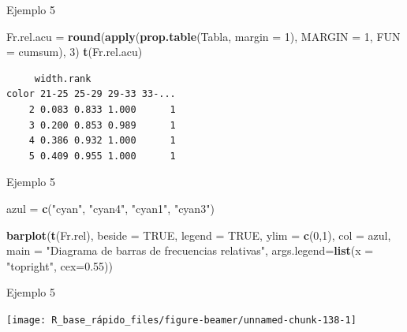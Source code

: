 \documentclass[
  ignorenonframetext,
  aspectratio=169]{beamer}
\newenvironment{Shaded}{\begin{snugshade}}{\end{snugshade}}
\newcommand{\AttributeTok}[1]{\textcolor[rgb]{0.13,0.29,0.53}{#1}}
\newcommand{\ConstantTok}[1]{\textcolor[rgb]{0.56,0.35,0.01}{#1}}
\newcommand{\DecValTok}[1]{\textcolor[rgb]{0.00,0.00,0.81}{#1}}
\newcommand{\FloatTok}[1]{\textcolor[rgb]{0.00,0.00,0.81}{#1}}
\newcommand{\FunctionTok}[1]{\textcolor[rgb]{0.13,0.29,0.53}{\textbf{#1}}}
\newcommand{\NormalTok}[1]{#1}
\newcommand{\OtherTok}[1]{\textcolor[rgb]{0.56,0.35,0.01}{#1}}
\newcommand{\StringTok}[1]{\textcolor[rgb]{0.31,0.60,0.02}{#1}}
\begin{document}
\begin{frame}[fragile]{Ejemplo 5}
\label{ejemplo-5-6}
\begin{Shaded}
\begin{Highlighting}[]
\NormalTok{Fr.rel.acu }\OtherTok{=} \FunctionTok{round}\NormalTok{(}\FunctionTok{apply}\NormalTok{(}\FunctionTok{prop.table}\NormalTok{(Tabla, }\AttributeTok{margin =} \DecValTok{1}\NormalTok{), }
                         \AttributeTok{MARGIN =} \DecValTok{1}\NormalTok{, }\AttributeTok{FUN =}\NormalTok{ cumsum), }\DecValTok{3}\NormalTok{)}
\FunctionTok{t}\NormalTok{(Fr.rel.acu)}
\end{Highlighting}
\end{Shaded}

\begin{verbatim}
     width.rank
color 21-25 25-29 29-33 33-...
    2 0.083 0.833 1.000      1
    3 0.200 0.853 0.989      1
    4 0.386 0.932 1.000      1
    5 0.409 0.955 1.000      1
\end{verbatim}
\end{frame}

\begin{frame}[fragile]{Ejemplo 5}
\label{ejemplo-5-7}
\begin{Shaded}
\begin{Highlighting}[]
\NormalTok{azul }\OtherTok{=} \FunctionTok{c}\NormalTok{(}\StringTok{"cyan"}\NormalTok{, }\StringTok{"cyan4"}\NormalTok{, }\StringTok{"cyan1"}\NormalTok{, }\StringTok{"cyan3"}\NormalTok{)}

\FunctionTok{barplot}\NormalTok{(}\FunctionTok{t}\NormalTok{(Fr.rel), }\AttributeTok{beside =} \ConstantTok{TRUE}\NormalTok{, }\AttributeTok{legend =} \ConstantTok{TRUE}\NormalTok{, }\AttributeTok{ylim =} \FunctionTok{c}\NormalTok{(}\DecValTok{0}\NormalTok{,}\DecValTok{1}\NormalTok{), }\AttributeTok{col =}\NormalTok{ azul, }
        \AttributeTok{main =} \StringTok{"Diagrama de barras de frecuencias relativas"}\NormalTok{, }
        \AttributeTok{args.legend=}\FunctionTok{list}\NormalTok{(}\AttributeTok{x =} \StringTok{"topright"}\NormalTok{, }\AttributeTok{cex=}\FloatTok{0.55}\NormalTok{))}
\end{Highlighting}
\end{Shaded}
\end{frame}

\begin{frame}{Ejemplo 5}
\label{ejemplo-5-8}
\begin{center}\texttt{[image: R\_base\_rápido\_files/figure-beamer/unnamed-chunk-138-1]} \end{center}
\end{frame}
\end{document}
